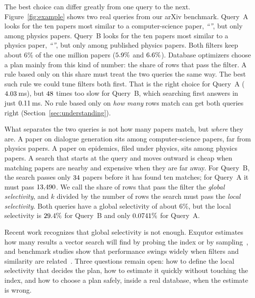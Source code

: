 \documentclass[sigconf, nonacm]{acmart}
\begin{document}
The best choice can differ greatly from one query to the next. Figure~\ref{fig:example} shows two real queries from our arXiv benchmark. Query~A looks for the ten papers most similar to a computer-science paper, \emph{``\ExATitle''}, but only among physics papers. Query~B looks for the ten papers most similar to a physics paper, \emph{``\ExBTitle''}, but only among published physics papers. Both filters keep about $6\%$ of the one million papers ($5.9\%$ and $6.6\%$). Database optimizers choose a plan mainly from this kind of number: the share of rows that pass the filter. A rule based only on this share must treat the two queries the same way. The best such rule we could tune filters both first. That is the right choice for Query~A ($4.03$\,ms), but $48$ times too slow for Query~B, which searching first answers in just $0.11$\,ms. No rule based only on \emph{how many} rows match can get both queries right (Section~\ref{sec:understanding}).

What separates the two queries is not how many papers match, but \emph{where} they are. A paper on dialogue generation sits among computer-science papers, far from physics papers. A paper on epidemics, filed under physics, sits among physics papers. A search that starts at the query and moves outward is cheap when matching papers are nearby and expensive when they are far away. For Query~B, the search passes only $34$ papers before it has found ten matches; for Query~A it must pass $13{,}490$. We call the share of rows that pass the filter the \emph{global selectivity}, and $k$ divided by the number of rows the search must pass the \emph{local selectivity}. Both queries have a global selectivity of about $6\%$, but the local selectivity is $29.4\%$ for Query~B and only $0.0741\%$ for Query~A.

Recent work recognizes that global selectivity is not enough. Exqutor estimates how many results a vector search will find by probing the index or by sampling~\cite{exqutor2026}, and benchmark studies show that performance swings widely when filters and similarity are related~\cite{amanbayev2026fanns,iff2025benchmark,shi2025unified}. Three questions remain open: how to define the local selectivity that decides the plan, how to estimate it quickly without touching the index, and how to choose a plan safely, inside a real database, when the estimate is wrong.
\end{document}
